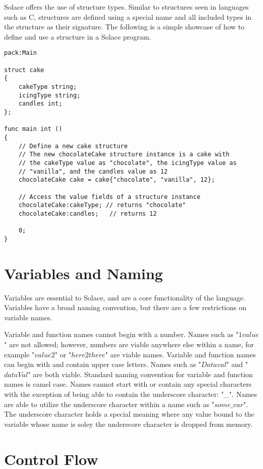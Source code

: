 \documentclass{article}
\begin{document}
Solace offers the use of structure types. Similar to structures seen in languages such as C, structures
are defined using a special name and all included types in the structure as their signature. The 
following is a simple showcase of how to define and use a structure in a Solace program.

\begin{lstlisting}
pack:Main

struct cake
{
	cakeType string;
	icingType string;
	candles int;
};

func main int ()
{
	// Define a new cake structure
	// The new chocolateCake structure instance is a cake with
	// the cakeType value as "chocolate", the icingType value as
	// "vanilla", and the candles value as 12
	chocolateCake cake = cake{"chocolate", "vanilla", 12};
	
	// Access the value fields of a structure instance
	chocolateCake:cakeType; // returns "chocolate"
	chocolateCake:candles;   // returns 12
	
	0;
}

\end{lstlisting}

\section{Variables and Naming}

Variables are essential to Solace, and are a core functionality of the language. Variables have a broad
naming convention, but there are a few restrictions on variable names.

Variable and function names cannot begin with a number. Names such as "$1value$" are not allowed; however,
numbers are viable anywhere else within a name, for example "$value2$" or "$here2there$" are viable 
names. Variable and function names can begin with and contain upper case letters. Names such as "$Dataval$"
and "$dataVal$" are both viable. Standard naming convention for variable and function names is camel case.
Names cannot start with or contain any special characters with the exception of being able to 
contain the underscore character: "\_". Names are able to utilize the underscore character within a name such
as "$some\_var$". The underscore character holds a special meaning where any value bound to the variable
whose name is soley the underscore character is dropped from memory.

\section{Control Flow}
\end{document}
